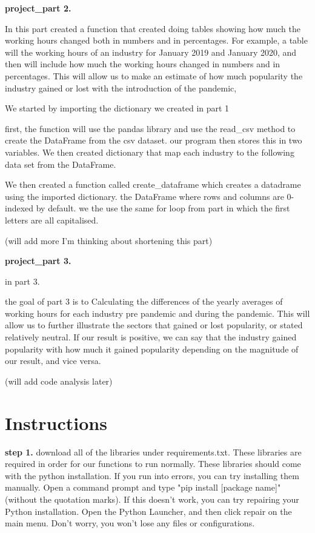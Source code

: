 \documentclass[fontsize=11pt]{article}
\begin{document}
\medskip 

\textbf{project\_part 2.}

In this part created a function that created doing tables showing how much the working hours changed both in numbers and in percentages. For example, a table will the working hours of an industry for January 2019 and January 2020, and then will include how much the working hours changed in numbers and in percentages. This will allow us to make an estimate of how much popularity the industry gained or lost with the introduction of the pandemic,

We started by importing the dictionary we created in part 1

first, the function will use the pandas library and use the read\_csv method to create the DataFrame from the csv dataset. our program then stores this in
two variables.
We then created dictionary that map each industry  to the following data set from the DataFrame.

We then created a function called create\_dataframe which creates a datadrame using the imported dictionary. the DataFrame where rows and columns are 0-indexed by default. we the use the same for loop from part in which the first letters are all capitalised.

(will add more I'm thinking about shortening this part)



\medskip 

\textbf{project\_part 3.}

in part 3.

the goal of part 3 is to Calculating the differences of the yearly averages of working hours for each industry pre pandemic and during the pandemic. This will allow us to further illustrate the sectors that gained or lost popularity, or stated relatively neutral. If our result is positive, we can say that the industry gained popularity with how much it gained popularity depending on the magnitude of our result, and vice versa.
  
 (will add code analysis later)
  
\section*{Instructions} 
 
\textbf{step 1.}
download all of the libraries under requirements.txt. These libraries are required in order for our functions to run normally. These libraries should come with the python installation. If you run into errors, you can try installing them manually. Open a command prompt and type "pip install [package name]" (without the quotation marks). If this doesn't work, you can try  repairing your Python installation. Open the Python Launcher, and then click repair on the main menu. Don't worry, you won't lose any files or configurations. \\
 
\end{document}
